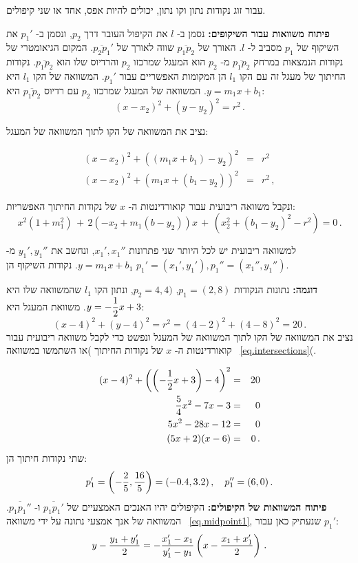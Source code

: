 עבור זוג נקודות נתון וקו נתון, יכולים להיות אפס, אחד או שני קיפולים.

\textbf{פיתוח משוואות עבור השיקופים:}
נסמן ב-%
$l$
את הקיפול העובר דרך
$p_2$,
ונסמן ב-%
$p_1'$
את השיקוף של
$p_1$
מסביב ל-%
$l$.
האורך של
$\overline{p_1p_2}$
שווה לאורך של
$\overline{p_2p_1}'$.
המקום הגיאומטרי של נקודות הנמצאות במרחק
$\overline{p_1p_2}$
מ-%
$p_2$
הוא המעגל שמרכזו
$p_2$
והרדיוס שלו הוא
$\overline{p_1p_2}$. 
נקודות החיתוך של מעגל זה עם הקו
$l_1$
הן המקומות האפשריים עבור
$p_1'$.
המשוואה של הקו
$l_1$
היא
$y=m_1x + b_1$.
המשוואה של המעגל שמרכזו
$p_2$
עם רדיוס
$\overline{p_1p_2}$
היא:
\[
(x-x_2)^2 + (y-y_2)^2 = r^2\,.
\]



נציב את המשוואה של הקו לתוך המשוואה של המעגל:

\begin{eqnarray*}
(x-x_2)^2+((m_1x+b_1)-y_2)^2&=&r^2\\
(x-x_2)^2+(m_1x+(b_1-y_2))^2&=&r^2\,,
\end{eqnarray*}



ונקבל משוואה ריבועית עבור קואורדינטות ה-%
$x$
של נקודות החיתוך האפשריות:
\begin{equation}
x^2(1+m_1^2) \,+\, 2(-x_2+m_1(b-y_2))x \,+\, (x_2^2 + (b_1-y_2)^2-r^2)=0\,.\label{eq.intersections}
\end{equation}




למשוואה ריבועית יש לכל היותר שני פתרונות
$x_1',x_1''$,
ונחשב את 
$y_1',y_1''$
מ-%
$y=m_1x+b_1$.
נקודות השיקוף הן
$p_1'=(x_1',y_1'), p_1''=(x_1'',y_1'')$.



\textbf{דוגמה:}
נתונות הנקודות
$p_1=(2,8)$,
$p_2=4,4)$,
ונתון הקו
$l_1$ 
שהמשוואה שלו היא
$y=-\displaystyle\frac{1}{2}x +3$.
משוואת המעגל היא:
\[
(x-4)^2 + (y-4)^2 = r^2=(4-2)^2+(4-8)^2=20\,.
\]
נציב את המשוואה של הקו לתוך המשוואה של המעגל ונפשט כדי לקבל משוואה ריבועית עבור קואורדינטות ה-%
$x$
של נקודות החיתוך )או השתמשו במשוואה
~\ref{eq.intersections}(.

\begin{eqnarray*}
(x-4)^2 + \left(\left(-\displaystyle\frac{1}{2}x+3\right)-4\right)^2&=&20\\
\displaystyle\frac{5}{4}x^2-7x-3 &=&0\\
5x^2 -28x -12&=&0\\
(5x+2)(x-6)&=&0\,.
\end{eqnarray*}
שתי נקודות חיתוך הן:
\[
p_1'=\left(-\displaystyle\frac{2}{5},\displaystyle\frac{16}{5}\right) = (-0.4,3.2)\,,\quad p_1''=(6,0)\,.
\]
\textbf{פיתוח המשוואות של הקיפולים:}
הקיפולים יהיו האנכים האמצעיים של
$\overline{p_1p_1'}$
ו-%
$\overline{p_1p_1''}$.
המשוואה של אנך אמצעי נתונה על ידי משוואה%
~\ref{eq.midpoint1},
שנעתיק כאן עבור
$p_1'$:
\begin{equation}
y - \displaystyle\frac{y_1+y_1'}{2} = -\displaystyle\frac{x_1'-x_1}{y_1'-y_1}\left(x-\displaystyle\frac{x_1+x_1'}{2}\right)\,.\label{eq.midpoint2}
\end{equation}

